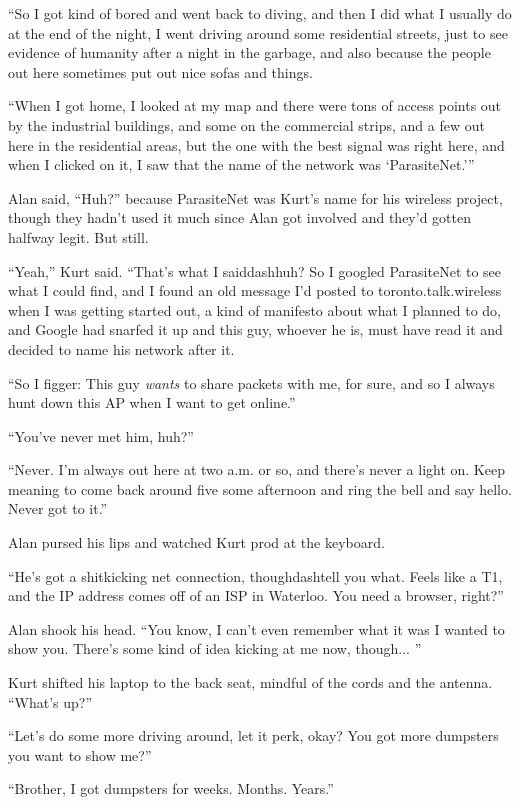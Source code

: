 ``So I got kind of bored and went back to diving, and then I did what
I usually do at the end of the night, I went driving around some
residential streets, just to see evidence of humanity after a night in
the garbage, and also because the people out here sometimes put out
nice sofas and things.

``When I got home, I looked at my map and there were tons of access
points out by the industrial buildings, and some on the commercial
strips, and a few out here in the residential areas, but the one with
the best signal was right here, and when I clicked on it, I saw that
the name of the network was `ParasiteNet.'''

Alan said, ``Huh?'' because ParasiteNet was Kurt's name for his
wireless project, though they hadn't used it much since Alan got
involved and they'd gotten halfway legit.  But still.

``Yeah,'' Kurt said.  ``That's what I saiddash{}huh?  So I googled
ParasiteNet to see what I could find, and I found an old message I'd
posted to toronto.talk.wireless when I was getting started out, a kind
of manifesto about what I planned to do, and Google had snarfed it up
and this guy, whoever he is, must have read it and decided to name his
network after it.

``So I figger:  This guy \textit{wants} to share packets with me, for
sure, and so I always hunt down this AP when I want to get online.''

``You've never met him, huh?''

``Never.  I'm always out here at two a.m.  or so, and there's never a
light on.  Keep meaning to come back around five some afternoon and
ring the bell and say hello.  Never got to it.''

Alan pursed his lips and watched Kurt prod at the keyboard.

``He's got a shitkicking net connection, thoughdash{}tell you what. 
Feels like a T1, and the IP address comes off of an ISP in Waterloo. 
You need a browser, right?''

Alan shook his head.  ``You know, I can't even remember what it was I
wanted to show you.  There's some kind of idea kicking at me now,
though...  ''

Kurt shifted his laptop to the back seat, mindful of the cords and the
antenna.  ``What's up?''

``Let's do some more driving around, let it perk, okay?  You got more
dumpsters you want to show me?''

``Brother, I got dumpsters for weeks.  Months.  Years.''

